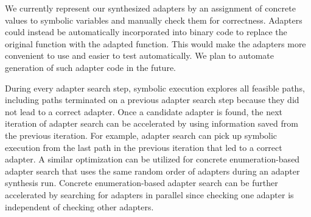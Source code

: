 We currently represent our synthesized adapters by an assignment of concrete values to symbolic variables and manually check them for correctness. 
%
Adapters could instead be automatically incorporated into binary code to replace the original function with the adapted function.
%
This would make the adapters more convenient to use and easier to test automatically.
We plan to automate generation of such adapter code in the future.

During every adapter search step, symbolic execution explores all feasible paths, including paths terminated on a previous adapter search step because they did not lead to a correct adapter.
%
Once a candidate adapter is found, the next iteration of adapter search can be accelerated by using information saved from the previous iteration.
For example, adapter search can pick up symbolic execution from the last path in the previous iteration that led to a correct adapter.
%
A similar optimization can be utilized for concrete enumeration-based adapter
search that uses the same random order of adapters during an adapter
synthesis run. 
%
Concrete enumeration-based adapter search can be further accelerated by
searching for adapters in parallel since checking one adapter is
independent of checking other adapters.

